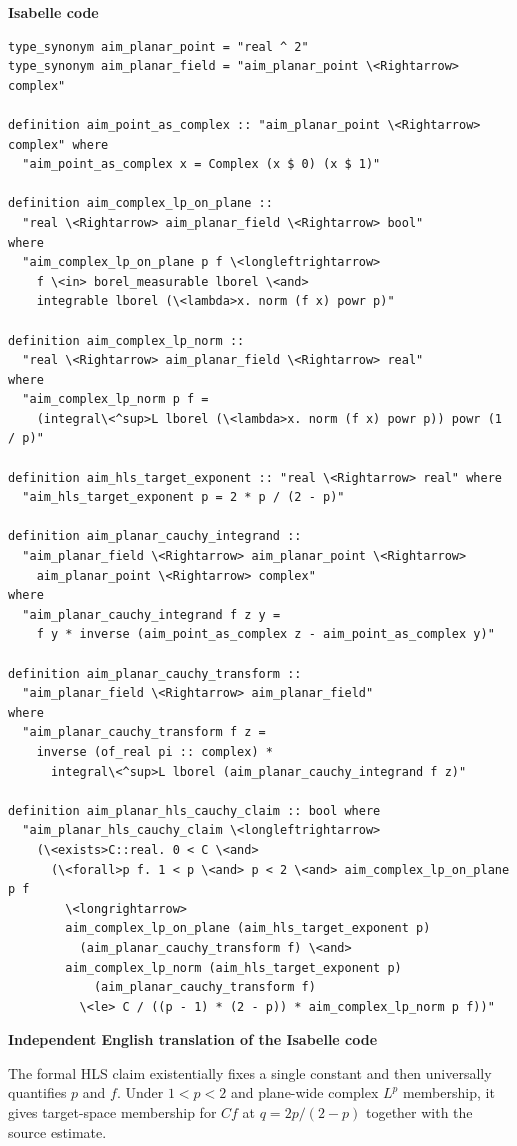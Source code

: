 \documentclass[10pt,oneside]{article}
\newcommand{\reviewlabel}[1]{\par\smallskip\noindent\textsf{\bfseries #1}\par\smallskip}
\begin{document}
\reviewlabel{Isabelle code}
\begin{lstlisting}
type_synonym aim_planar_point = "real ^ 2"
type_synonym aim_planar_field = "aim_planar_point \<Rightarrow> complex"

definition aim_point_as_complex :: "aim_planar_point \<Rightarrow> complex" where
  "aim_point_as_complex x = Complex (x $ 0) (x $ 1)"

definition aim_complex_lp_on_plane ::
  "real \<Rightarrow> aim_planar_field \<Rightarrow> bool"
where
  "aim_complex_lp_on_plane p f \<longleftrightarrow>
    f \<in> borel_measurable lborel \<and>
    integrable lborel (\<lambda>x. norm (f x) powr p)"

definition aim_complex_lp_norm ::
  "real \<Rightarrow> aim_planar_field \<Rightarrow> real"
where
  "aim_complex_lp_norm p f =
    (integral\<^sup>L lborel (\<lambda>x. norm (f x) powr p)) powr (1 / p)"

definition aim_hls_target_exponent :: "real \<Rightarrow> real" where
  "aim_hls_target_exponent p = 2 * p / (2 - p)"

definition aim_planar_cauchy_integrand ::
  "aim_planar_field \<Rightarrow> aim_planar_point \<Rightarrow>
    aim_planar_point \<Rightarrow> complex"
where
  "aim_planar_cauchy_integrand f z y =
    f y * inverse (aim_point_as_complex z - aim_point_as_complex y)"

definition aim_planar_cauchy_transform ::
  "aim_planar_field \<Rightarrow> aim_planar_field"
where
  "aim_planar_cauchy_transform f z =
    inverse (of_real pi :: complex) *
      integral\<^sup>L lborel (aim_planar_cauchy_integrand f z)"

definition aim_planar_hls_cauchy_claim :: bool where
  "aim_planar_hls_cauchy_claim \<longleftrightarrow>
    (\<exists>C::real. 0 < C \<and>
      (\<forall>p f. 1 < p \<and> p < 2 \<and> aim_complex_lp_on_plane p f
        \<longrightarrow>
        aim_complex_lp_on_plane (aim_hls_target_exponent p)
          (aim_planar_cauchy_transform f) \<and>
        aim_complex_lp_norm (aim_hls_target_exponent p)
            (aim_planar_cauchy_transform f)
          \<le> C / ((p - 1) * (2 - p)) * aim_complex_lp_norm p f))"
\end{lstlisting}

\reviewlabel{Independent English translation of the Isabelle code}
The formal HLS claim existentially fixes a single constant and then universally quantifies $p$ and $f$. Under $1<p<2$ and plane-wide complex $L^p$ membership, it gives target-space membership for $Cf$ at $q=2p/(2-p)$ together with the source estimate.
\end{document}
